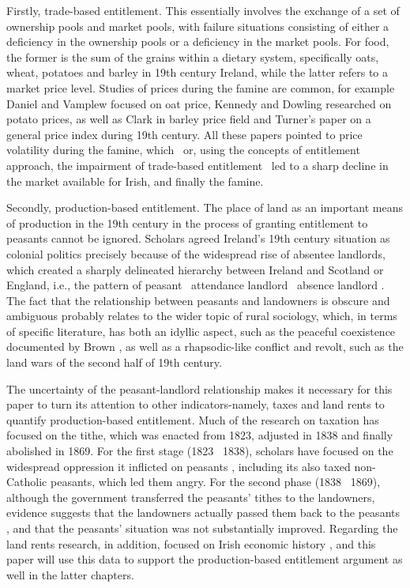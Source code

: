 Firstly, trade-based entitlement. This essentially involves the exchange of a set of ownership pools and market pools, with failure situations consisting of either a deficiency in the ownership pools or a deficiency in the market pools. For food, the former is the sum of the grains within a dietary system, specifically oats, wheat, potatoes and barley in 19th century Ireland, while the latter refers to a market price level. Studies of prices during the famine are common, for example Daniel \citep{daniel2021irish} and Vamplew \citep{vamplew1980grain} focused on oat price, Kennedy and Dowling \citep{kennedy1997prices} researched on potato prices, as well as Clark \citep{clark2004price} in barley price field and Turner's \citep{turner1987towards} paper on a general price index during 19th century. All these papers pointed to price volatility during the famine, which \textendash\ or, using the concepts of entitlement approach, the impairment of trade-based entitlement \textendash\ led to a sharp decline in the market available for Irish, and finally the famine.

Secondly, production-based entitlement. The place of land as an important means of production in the 19th century in the process of granting entitlement to peasants cannot be ignored. Scholars agreed Ireland's 19th century situation as colonial politics \citep{duffy2017colonial, cairns1988writing, nally2008coming} precisely because of the widespread rise of absentee landlords, which created a sharply delineated hierarchy between Ireland and Scotland or England, i.e., the pattern of peasant \textendash\ attendance landlord \textendash\ absence landlord \citep{braa1997great}. The fact that the relationship between peasants and landowners is obscure and ambiguous probably relates to the wider topic of rural sociology, which, in terms of specific literature, has both an idyllic aspect, such as the peaceful coexistence documented by Brown \citep{brown1953nationalism}, as well as a rhapsodic-like conflict and revolt, such as the land wars of the second half of 19th century.

The uncertainty of the peasant-landlord relationship makes it necessary for this paper to turn its attention to other indicators-namely, taxes and land rents to quantify production-based entitlement. Much of the research on taxation has focused on the tithe, which was enacted from 1823, adjusted in 1838 and finally abolished in 1869. For the first stage (1823 \textendash\ 1838), scholars have focused on the widespread oppression it inflicted on peasants \citep{shaw2015economic, shaw2018composition}, including its also taxed non-Catholic peasants, which led them angry. For the second phase (1838 \textendash\ 1869), although the government transferred the peasants' tithes to the landowners, evidence suggests that the landowners actually passed them back to the peasants \citep{brynn1970irish}, and that the peasants' situation was not substantially improved.
Regarding the land rents research, in addition, focused 
on Irish economic history \citep{m2013land, guinnane1996bonds}, and this paper will use this data to support the production-based entitlement argument as well in the latter chapters.

